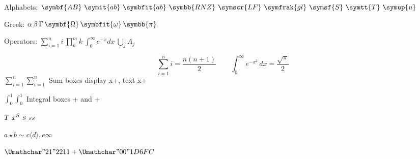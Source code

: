 \documentclass{article}
\begin{document}
Alphabets: $\symbf{AB}\ \symit{ab}\ \symbfit{ab}\ \symbb{RNZ}\ \symscr{LF}\ \symfrak{gl}\ \symsf{S}\ \symtt{T}\ \symup{u}$\par
Greek: $\alpha\,\beta\,\Gamma\,\symbf{\Omega}\,\symbfit{\omega}\,\symbb{\pi}$\par
Operators: $\sum_{i=1}^{n} i\ \prod_{k}^{m} k\ \int_0^\infty e^{-x}dx\ \bigcup_{j} A_j$\par
\[ \sum_{i=1}^{n} i = \frac{n(n+1)}{2}\qquad \int_0^\infty e^{-x^2}\,dx = \frac{\sqrt\pi}{2} \]
\hbox{$\displaystyle\sum_{i=1}^{n}$}\hbox{$\textstyle\sum_{i=1}^{n}$}
Sum boxes display \the{} x\the{}+\the{}, text \the{} x\the{}+\the{}\par
{}\hbox{$\displaystyle\int_0^1$}\hbox{$\textstyle\int_0^1$}
Integral boxes \the{}+\the{} and \the{}+\the{}\par
$\mathchoice{D}{T}{S}{SS}\ x^{\mathchoice{D}{T}{S}{SS}}\ {\scriptstyle S}\ {\scriptscriptstyle SS}$\par
$a \mathbin{\star} b \mathrel{\sim} c \mathopen{\langle} d \mathclose{\rangle} \mathpunct{,} e \mathord{\infty}$\par
$\Umathchar"2 1 "2211 + \Umathchar"0 0 "1D6FC$\par
\end{document}
